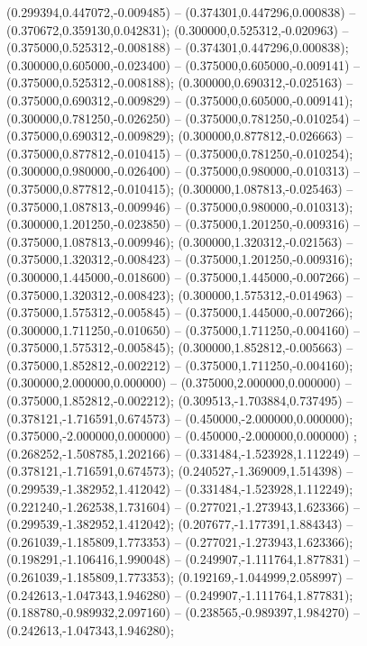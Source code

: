  (0.299394,0.447072,-0.009485) -- (0.374301,0.447296,0.000838) -- (0.370672,0.359130,0.042831);
 (0.300000,0.525312,-0.020963) -- (0.375000,0.525312,-0.008188) -- (0.374301,0.447296,0.000838);
 (0.300000,0.605000,-0.023400) -- (0.375000,0.605000,-0.009141) -- (0.375000,0.525312,-0.008188);
 (0.300000,0.690312,-0.025163) -- (0.375000,0.690312,-0.009829) -- (0.375000,0.605000,-0.009141);
 (0.300000,0.781250,-0.026250) -- (0.375000,0.781250,-0.010254) -- (0.375000,0.690312,-0.009829);
 (0.300000,0.877812,-0.026663) -- (0.375000,0.877812,-0.010415) -- (0.375000,0.781250,-0.010254);
 (0.300000,0.980000,-0.026400) -- (0.375000,0.980000,-0.010313) -- (0.375000,0.877812,-0.010415);
 (0.300000,1.087813,-0.025463) -- (0.375000,1.087813,-0.009946) -- (0.375000,0.980000,-0.010313);
 (0.300000,1.201250,-0.023850) -- (0.375000,1.201250,-0.009316) -- (0.375000,1.087813,-0.009946);
 (0.300000,1.320312,-0.021563) -- (0.375000,1.320312,-0.008423) -- (0.375000,1.201250,-0.009316);
 (0.300000,1.445000,-0.018600) -- (0.375000,1.445000,-0.007266) -- (0.375000,1.320312,-0.008423);
 (0.300000,1.575312,-0.014963) -- (0.375000,1.575312,-0.005845) -- (0.375000,1.445000,-0.007266);
 (0.300000,1.711250,-0.010650) -- (0.375000,1.711250,-0.004160) -- (0.375000,1.575312,-0.005845);
 (0.300000,1.852812,-0.005663) -- (0.375000,1.852812,-0.002212) -- (0.375000,1.711250,-0.004160);
 (0.300000,2.000000,0.000000) -- (0.375000,2.000000,0.000000) -- (0.375000,1.852812,-0.002212);
 (0.309513,-1.703884,0.737495) -- (0.378121,-1.716591,0.674573) -- (0.450000,-2.000000,0.000000);
 (0.375000,-2.000000,0.000000) -- (0.450000,-2.000000,0.000000) ;
 (0.268252,-1.508785,1.202166) -- (0.331484,-1.523928,1.112249) -- (0.378121,-1.716591,0.674573);
 (0.240527,-1.369009,1.514398) -- (0.299539,-1.382952,1.412042) -- (0.331484,-1.523928,1.112249);
 (0.221240,-1.262538,1.731604) -- (0.277021,-1.273943,1.623366) -- (0.299539,-1.382952,1.412042);
 (0.207677,-1.177391,1.884343) -- (0.261039,-1.185809,1.773353) -- (0.277021,-1.273943,1.623366);
 (0.198291,-1.106416,1.990048) -- (0.249907,-1.111764,1.877831) -- (0.261039,-1.185809,1.773353);
 (0.192169,-1.044999,2.058997) -- (0.242613,-1.047343,1.946280) -- (0.249907,-1.111764,1.877831);
 (0.188780,-0.989932,2.097160) -- (0.238565,-0.989397,1.984270) -- (0.242613,-1.047343,1.946280);
